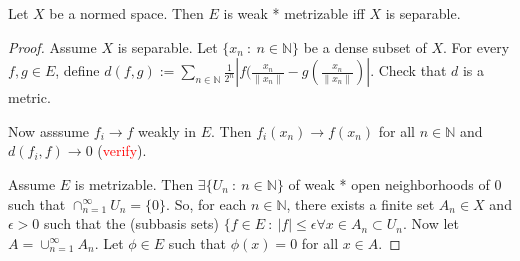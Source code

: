 \begin{theorem}
  Let $X$ be a normed space. Then $E$ is weak * metrizable iff $X$ is separable. 
\end{theorem}
\begin{proof}
  Assume $X$ is separable. Let $\{ x_n  \ : \  n \in \mathbb{N} \}$ be a dense subset of $X$. For every $f, g \in E$, define $d(f, g) := \sum_{n \in \mathbb{N}}  \frac{1}{2^n}|f( \frac{x_n}{\|x_n\|} - g( \frac{x_n}{\|x_n\|} )|$. Check that $d$ is a metric.

  Now asssume $f_i \to f$ weakly in $E$. Then $f_i(x_n) \to f(x_n)$ for all $n \in \mathbb{N}$ and $d(f_i, f) \to 0$ (\textcolor{red}{verify}). 

  Assume $E$ is metrizable. Then $\exists \{ U_n \ : \ n \in \mathbb{N} \}$ of weak * open neighborhoods of $0$ such that $\cap_{n = 1}^{\infty}U_n = \{ 0 \}$. So, for each $ n \in \mathbb{N}$, there exists a finite set $ A_n \in X$ and $\epsilon > 0$ such that the (subbasis sets) $\{ f \in E \ : \ |f|\le \epsilon \forall x \in A_n  \subset U_n$. Now let $A = \cup_{n = 1}^{\infty}A_n$. Let $\phi \in E$ such that $\phi(x) = 0$ for all $x \in A$. 
\end{proof}
